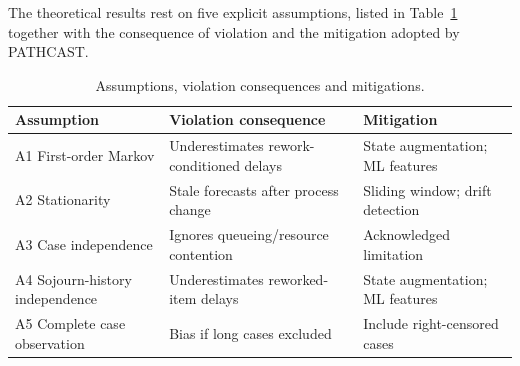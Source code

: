 The theoretical results rest on five explicit assumptions, listed in
Table~\ref{tab:assumptions} together with the consequence of
violation and the mitigation adopted by PATHCAST.

\begin{table}[ht]
\centering
\caption{Assumptions, violation consequences and mitigations.}
\label{tab:assumptions}
\small
\begin{tabular}{@{}p{2.6cm} p{4.6cm} p{4.6cm}@{}}
\toprule
\textbf{Assumption} & \textbf{Violation consequence} & \textbf{Mitigation} \\
\midrule
A1 First-order Markov            & Underestimates rework-conditioned delays & State augmentation; ML features \\
A2 Stationarity                   & Stale forecasts after process change      & Sliding window; drift detection \\
A3 Case independence              & Ignores queueing/resource contention      & Acknowledged limitation \\
A4 Sojourn-history independence   & Underestimates reworked-item delays       & State augmentation; ML features \\
A5 Complete case observation      & Bias if long cases excluded               & Include right-censored cases \\
\bottomrule
\end{tabular}
\end{table}
